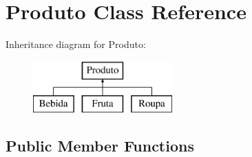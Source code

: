 \hypertarget{classProduto}{}\section{Produto Class Reference}
\label{classProduto}
Inheritance diagram for Produto\+:\begin{figure}[H]
\begin{center}
\leavevmode
\includegraphics[height=2.000000cm]{classProduto}
\end{center}
\end{figure}
\subsection*{Public Member Functions}
